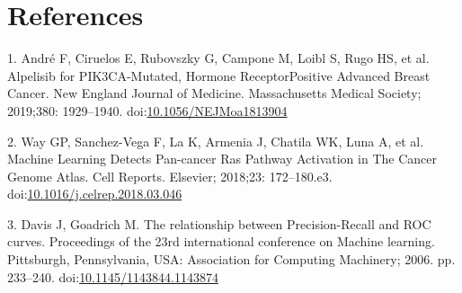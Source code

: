 \documentclass[10pt,letterpaper]{article}
\begin{document}
\hypertarget{references}{%
\section*{References}\label{references}}

\hypertarget{refs}{}
\leavevmode\hypertarget{ref-andre_2019_alpelisib_nengljmeda}{}%
1. André F, Ciruelos E, Rubovszky G, Campone M, Loibl S, Rugo HS, et al.
Alpelisib for PIK3CA-Mutated, Hormone ReceptorPositive Advanced Breast
Cancer. New England Journal of Medicine. Massachusetts Medical Society;
2019;380: 1929--1940.
doi:\href{https://doi.org/10.1056/NEJMoa1813904}{10.1056/NEJMoa1813904}

\leavevmode\hypertarget{ref-way_2018_machine_cellreports}{}%
2. Way GP, Sanchez-Vega F, La K, Armenia J, Chatila WK, Luna A, et al.
Machine Learning Detects Pan-cancer Ras Pathway Activation in The Cancer
Genome Atlas. Cell Reports. Elsevier; 2018;23: 172--180.e3.
doi:\href{https://doi.org/10.1016/j.celrep.2018.03.046}{10.1016/j.celrep.2018.03.046}

\leavevmode\hypertarget{ref-davis_2006_relationship_proc23rdintconfmachlearn}{}%
3. Davis J, Goadrich M. The relationship between Precision-Recall and
ROC curves. Proceedings of the 23rd international conference on Machine
learning. Pittsburgh, Pennsylvania, USA: Association for Computing
Machinery; 2006. pp. 233--240.
doi:\href{https://doi.org/10.1145/1143844.1143874}{10.1145/1143844.1143874}

\nolinenumbers
\end{document}
